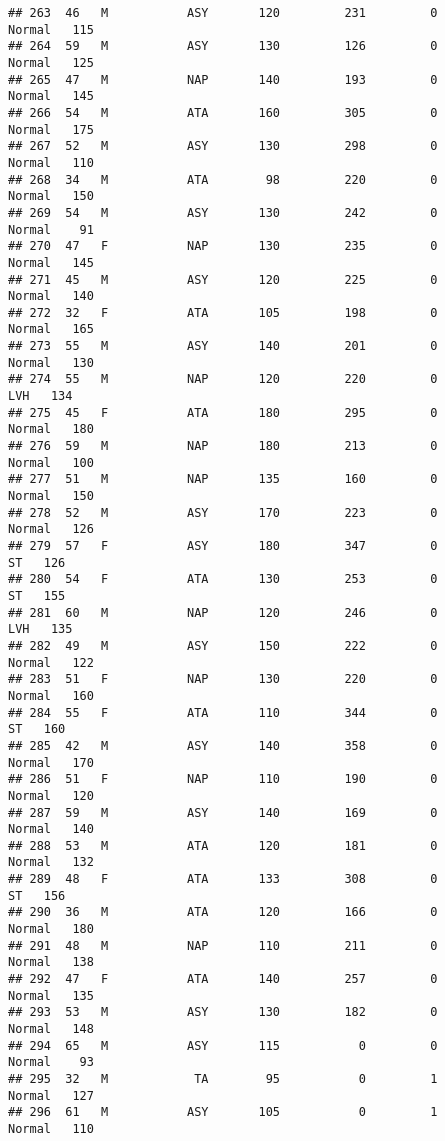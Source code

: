 \documentclass[
]{article}
\begin{document}
\begin{verbatim}
## 263  46   M           ASY       120         231         0     Normal   115
## 264  59   M           ASY       130         126         0     Normal   125
## 265  47   M           NAP       140         193         0     Normal   145
## 266  54   M           ATA       160         305         0     Normal   175
## 267  52   M           ASY       130         298         0     Normal   110
## 268  34   M           ATA        98         220         0     Normal   150
## 269  54   M           ASY       130         242         0     Normal    91
## 270  47   F           NAP       130         235         0     Normal   145
## 271  45   M           ASY       120         225         0     Normal   140
## 272  32   F           ATA       105         198         0     Normal   165
## 273  55   M           ASY       140         201         0     Normal   130
## 274  55   M           NAP       120         220         0        LVH   134
## 275  45   F           ATA       180         295         0     Normal   180
## 276  59   M           NAP       180         213         0     Normal   100
## 277  51   M           NAP       135         160         0     Normal   150
## 278  52   M           ASY       170         223         0     Normal   126
## 279  57   F           ASY       180         347         0         ST   126
## 280  54   F           ATA       130         253         0         ST   155
## 281  60   M           NAP       120         246         0        LVH   135
## 282  49   M           ASY       150         222         0     Normal   122
## 283  51   F           NAP       130         220         0     Normal   160
## 284  55   F           ATA       110         344         0         ST   160
## 285  42   M           ASY       140         358         0     Normal   170
## 286  51   F           NAP       110         190         0     Normal   120
## 287  59   M           ASY       140         169         0     Normal   140
## 288  53   M           ATA       120         181         0     Normal   132
## 289  48   F           ATA       133         308         0         ST   156
## 290  36   M           ATA       120         166         0     Normal   180
## 291  48   M           NAP       110         211         0     Normal   138
## 292  47   F           ATA       140         257         0     Normal   135
## 293  53   M           ASY       130         182         0     Normal   148
## 294  65   M           ASY       115           0         0     Normal    93
## 295  32   M            TA        95           0         1     Normal   127
## 296  61   M           ASY       105           0         1     Normal   110

\end{verbatim}
\end{document}
